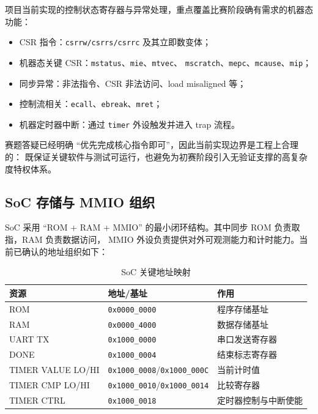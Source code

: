 项目当前实现的控制状态寄存器与异常处理，重点覆盖比赛阶段确有需求的机器态功能：

\begin{itemize}
    \item CSR 指令：\texttt{csrrw/csrrs/csrrc} 及其立即数变体；
    \item 机器态关键 CSR：\texttt{mstatus}、\texttt{mie}、\texttt{mtvec}、
    \texttt{mscratch}、\texttt{mepc}、\texttt{mcause}、\texttt{mip}；
    \item 同步异常：非法指令、CSR 非法访问、load misaligned 等；
    \item 控制流相关：\texttt{ecall}、\texttt{ebreak}、\texttt{mret}；
    \item 机器定时器中断：通过 \texttt{timer} 外设触发并进入 trap 流程。
\end{itemize}

赛题答疑已经明确 ``优先完成核心指令即可''，因此当前实现边界是工程上合理的：
既保证关键软件与测试可运行，也避免为初赛阶段引入无验证支撑的高复杂度特权体系。

\subsection{SoC 存储与 MMIO 组织}

SoC 采用 ``ROM + RAM + MMIO'' 的最小闭环结构。其中同步 ROM 负责取指，RAM 负责数据访问，
MMIO 外设负责提供对外可观测能力和计时能力。当前已确认的地址组织如下：

\begin{table}[H]
    \centering
    \caption{SoC 关键地址映射}
    \begin{tabular}{p{} p{} p{}}
        \toprule
        资源 & 地址/基址 & 作用 \\
        \midrule
        ROM & \texttt{0x0000\_0000} & 程序存储基址 \\
        RAM & \texttt{0x0000\_4000} & 数据存储基址 \\
        UART TX & \texttt{0x1000\_0000} & 串口发送寄存器 \\
        DONE & \texttt{0x1000\_0004} & 结束标志寄存器 \\
        TIMER VALUE LO/HI & \texttt{0x1000\_0008}/\texttt{0x1000\_000C} & 当前计时值 \\
        TIMER CMP LO/HI & \texttt{0x1000\_0010}/\texttt{0x1000\_0014} & 比较寄存器 \\
        TIMER CTRL & \texttt{0x1000\_0018} & 定时器控制与中断使能 \\
        \bottomrule
    \end{tabular}
\end{table}

